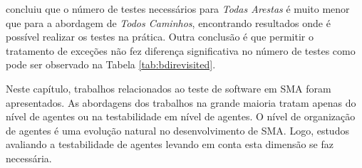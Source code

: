 \cite{winikoff2017bdi} concluiu que o número de testes necessários para \textit{Todas Arestas} é muito menor que para a abordagem de \textit{Todos Caminhos}, encontrando resultados onde é possível realizar os testes na prática. Outra conclusão é que permitir o tratamento de exceções não fez diferença significativa no número de testes como pode ser observado na Tabela \ref{tab:bdirevisited}.

Neste capítulo, trabalhos relacionados ao teste de software em SMA foram apresentados. As abordagens dos trabalhos na grande maioria tratam apenas do nível de agentes ou na testabilidade em nível de agentes. O nível de organização de agentes é uma evolução natural no desenvolvimento de SMA. Logo, estudos avaliando a testabilidade de agentes levando em conta esta dimensão se faz necessária.


